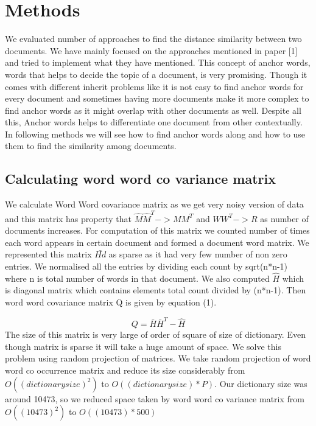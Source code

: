 \documentclass[a4paper,11pt]{article}
\begin{document}
\section{Methods}
We evaluated number of approaches to find the distance similarity between two documents. We have mainly focused on the approaches mentioned in paper [1] and tried to implement what they have mentioned. This concept of anchor words, words that helps to decide the topic of a document, is very promising. Though it comes with different inherit problems like it is not easy to find anchor words for every document and sometimes having more documents make it more complex to find anchor words as it might overlap with other documents as well. Despite all this, Anchor words helps to differentiate one document from other contextually. In following methods we will see how to find anchor words along and how to use them to find the similarity among documents. \\

\subsection{Calculating word word co variance matrix}
We calculate Word Word covariance matrix as we get very noisy version of data and this matrix has property that  $\hat{M} \hat{M}^T -> M M^T $ and $W W^T -> R$ as number of documents increases. For computation of this matrix we counted number of times each word appears in certain document and formed a document word matrix. We represented this matrix $\bar{Hd}$ as sparse as it had very few number of non zero entries. We normalised all the entries by dividing each count by sqrt(n*n-1) where n is total number of words in that document. We also computed $\hat{H}$ which is diagonal matrix which contains elements total count divided by (n*n-1). Then word word covariance matrix Q is given by equation (1).

\begin{equation}
Q = \bar{H} \bar{H}^T - \hat{H}
\end{equation}
The size of this matrix is very large of order of square of size of dictionary. Even though matrix is sparse it will take a huge amount of space. We solve this problem using random projection of matrices. We take random projection of word word co occurrence matrix and reduce its size considerably from $O((dictionary size)^2)$ to $O((dictionary size)*P)$. Our dictionary size was around 10473, so we reduced space taken by word word co variance matrix from $O((10473)^2)$ to $O((10473)*500)$
\end{document}
